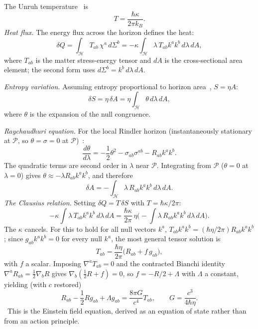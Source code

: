 The Unruh temperature~\cite{Unruh1976} is
\begin{equation}T=\frac{\hbar\kappa}{2\pi k_B}.\label{eq:th:unruh}\end{equation}
\emph{Heat flux.} The energy flux across the horizon defines the heat:
\begin{equation}\delta Q=\int_{\mathcal H}T_{ab}\,\chi^a\,d\Sigma^b=-\kappa\int_{\mathcal H}\lambda\,T_{ab}k^ak^b\,d\lambda\,dA ,\label{eq:th:dQ}\end{equation}
where $T_{ab}$ is the matter stress-energy tensor and $dA$ is the cross-sectional area element; the second form uses $d\Sigma^b=k^b\,d\lambda\,dA$. \derived{}

\emph{Entropy variation.} Assuming entropy proportional to horizon area~\cite{Bekenstein1973}, $S=\eta A$:
\begin{equation}\delta S=\eta\,\delta A=\eta\int_{\mathcal H}\theta\,d\lambda\,dA ,\label{eq:th:dS}\end{equation}
where $\theta$ is the expansion of the null congruence. \derived{}

\emph{Raychaudhuri equation.} For the local Rindler horizon (instantaneously stationary at $\mathcal P$, so $\theta=\sigma=0$ at $\mathcal P$)~\cite{Raychaudhuri1955}:
\begin{equation}\frac{d\theta}{d\lambda}=-\frac12\theta^2-\sigma_{ab}\sigma^{ab}-R_{ab}k^ak^b .\label{eq:th:raych}\end{equation}
The quadratic terms are second order in $\lambda$ near $\mathcal P$. Integrating from $\mathcal P$ ($\theta=0$ at $\lambda=0$) gives
$\theta\approx-\lambda R_{ab}k^ak^b$, and therefore
\begin{equation}\delta A=-\int_{\mathcal H}\lambda\,R_{ab}k^ak^b\,d\lambda\,dA .\label{eq:th:dA}\end{equation}
\emph{The Clausius relation.} Setting $\delta Q=T\,\delta S$ with $T=\hbar\kappa/2\pi$:
\begin{equation}-\kappa\int\lambda\,T_{ab}k^ak^b\,d\lambda\,dA=\frac{\hbar\kappa}{2\pi}\,\eta\Big(-\int\lambda\,R_{ab}k^ak^b\,d\lambda\,dA\Big).\label{eq:th:clausius}\end{equation}
The $\kappa$ cancels. For this to hold for all null vectors $k^a$, $T_{ab}k^ak^b=(\hbar\eta/2\pi)R_{ab}k^ak^b$; since $g_{ab}k^ak^b=0$ for every null
$k^a$, the most general tensor solution is
\begin{equation}T_{ab}=\frac{\hbar\eta}{2\pi}\big(R_{ab}+f\,g_{ab}\big),\label{eq:th:Tab}\end{equation}
with $f$ a scalar. Imposing $\nabla^aT_{ab}=0$ and the contracted Bianchi identity $\nabla^aR_{ab}=\tfrac12\nabla_bR$ gives $\nabla_b(\tfrac12R+f)=0$,
so $f=-R/2+\Lambda$ with $\Lambda$ a constant, yielding (with $c$ restored)
\begin{equation}R_{ab}-\frac12Rg_{ab}+\Lambda g_{ab}=\frac{8\pi G}{c^4}T_{ab},\qquad G=\frac{c^3}{4\hbar\eta}.\label{eq:th:einstein}\end{equation}
\derived\ This is the Einstein field equation, derived as an equation of state rather than from an action principle.

